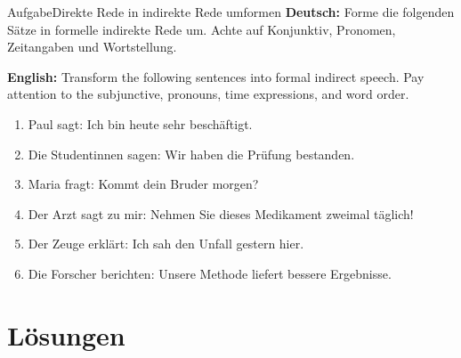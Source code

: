 \documentclass[a4paper,11pt]{article}
\newcommand{\GermanText}[1]{\textbf{Deutsch: }#1\par}
\newcommand{\EnglishText}[1]{{\small\color{SoftGray}\textbf{English: }#1\par}}
\begin{document}
        \begin{grammarentry}{Aufgabe}{Direkte Rede in indirekte Rede umformen}
            \GermanText{Forme die folgenden Sätze in formelle indirekte Rede um. Achte auf Konjunktiv, Pronomen, Zeitangaben und Wortstellung.}
            \EnglishText{Transform the following sentences into formal indirect speech. Pay attention to the subjunctive, pronouns, time expressions, and word order.}

            \begin{enumerate}
                \item Paul sagt: \glqq Ich bin heute sehr beschäftigt.\grqq
                \item Die Studentinnen sagen: \glqq Wir haben die Prüfung bestanden.\grqq
                \item Maria fragt: \glqq Kommt dein Bruder morgen?\grqq
                \item Der Arzt sagt zu mir: \glqq Nehmen Sie dieses Medikament zweimal täglich!\grqq
                \item Der Zeuge erklärt: \glqq Ich sah den Unfall gestern hier.\grqq
                \item Die Forscher berichten: \glqq Unsere Methode liefert bessere Ergebnisse.\grqq
            \end{enumerate}
        \end{grammarentry}


    \section{Lösungen}
\end{document}
